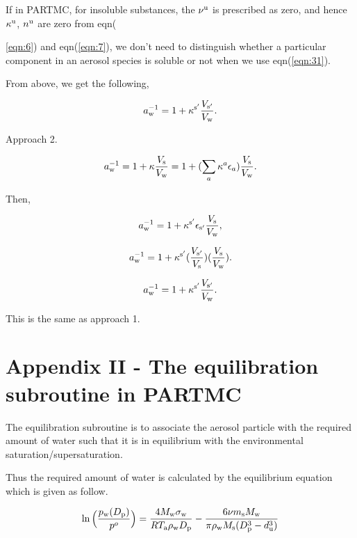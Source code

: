 \documentclass[12pt]{article}
\begin{document}
If in PARTMC, for insoluble substances, the $\nu^{\rm u}$ is prescribed as zero, and hence $\kappa^{\rm u}$, $n^{\rm u}$  are zero from eqn({\ref{eqn:6}) and eqn(\ref{eqn:7}), we don't need to distinguish whether a particular component in an aerosol species is soluble or not when we use eqn(\ref{eqn:31}).

From above, we get the following,

\begin{equation}\label{eqn:37}
a_{\rm w}^{-1}=1+ \kappa^{\rm s'} \frac{V_{\rm s'}}{V_{\rm w}}.
\end{equation}

Approach 2.

\begin{equation}\label{eqn:38}
a_{\rm w}^{-1}=1+\kappa \frac{V_{\rm s}}{V_{\rm w}}=1+ (\sum_{a} \kappa^{a} \epsilon_{a})\frac{V_{\rm s}}{V_{\rm w}}.
\end{equation}

Then,

\begin{equation}\label{eqn:39}
a_{\rm w}^{-1}=1+ \kappa^{\rm s'} \epsilon_{\rm s'} \frac{V_{\rm s}}{V_{\rm w}},
\end{equation}

\begin{equation}\label{eqn:40}
a_{\rm w}^{-1}=1+ \kappa^{\rm s'} (\frac{V_{\rm s'}}{V_{\rm s}})(\frac{V_{\rm s}}{V_{\rm w}}).
\end{equation}

\begin{equation}\label{eqn:37}
a_{\rm w}^{-1}=1+ \kappa^{\rm s'} \frac{V_{\rm s'}}{V_{\rm w}}.
\end{equation}

This is the same as approach 1. 


\section{Appendix II - The equilibration subroutine in PARTMC}

The equilibration subroutine is to associate the aerosol particle with the required amount of water such that it is in equilibrium with the environmental saturation/supersaturation.

Thus the required amount of water is calculated by the equilibrium equation which is given as follow.

\begin{equation}
\ln{\Big(\frac{p_{\rm w}(D_{\rm p})}{p^{o}}\Big)}=\frac{4 M_{\rm w} \sigma_{\rm w}}{R T_{\rm a} \rho_{\rm w} D_{\rm p}}-\frac{6 \nu m_{\rm s} M_{\rm w}}{\pi \rho_{\rm w} M_{\rm s}(D_{\rm p}^{3}-d_{\rm u}^{3})}
\end{equation}

}
\end{document}
